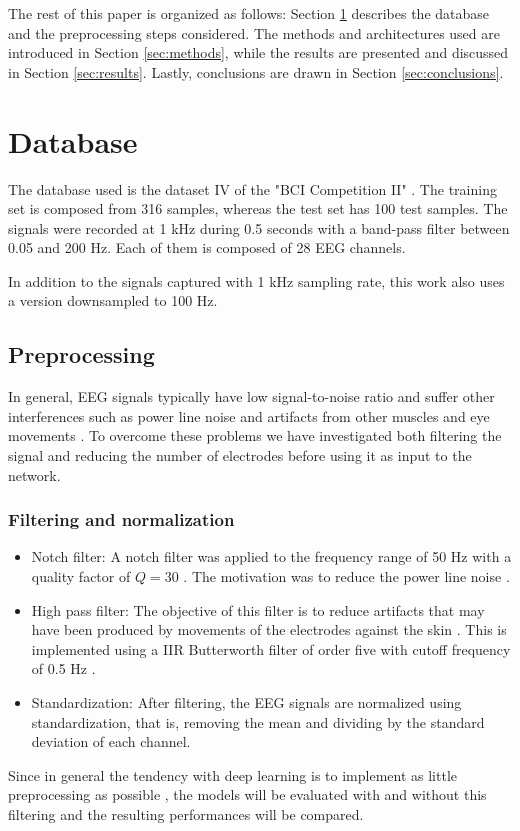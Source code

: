 \documentclass[10pt,conference,compsocconf]{IEEEtran}
\begin{document}
The rest of this paper is organized as follows: Section \ref{sec:database} describes the database and the preprocessing steps considered. The methods and architectures used are introduced in Section \ref{sec:methods}, while the results are presented and discussed in Section \ref{sec:results}. Lastly, conclusions are drawn in Section \ref{sec:conclusions}.

\section{Database}
\label{sec:database}
The database used is the dataset IV of the "BCI Competition II" \cite{data}. The training set is composed from 316 samples, whereas the test set has 100 test samples. The signals were recorded at 1 kHz during 0.5 seconds with a band-pass filter between 0.05 and 200 Hz. Each of them is composed of 28 EEG channels. 

In addition to the signals captured with 1 kHz sampling rate, this work also uses a version downsampled to 100 Hz.


\subsection{Preprocessing}
\label{ssec:preprocessing}

In general, EEG signals typically have low signal-to-noise ratio and suffer other interferences such as power line noise and artifacts from other muscles and eye movements \cite{SchirrmeisterSF17, LSTM, BashivanRYC15}. To overcome these problems we have investigated both filtering the signal and reducing the number of electrodes before using it as input to the network.

    \subsubsection{Filtering and normalization}
        \begin{itemize}
        
            \item Notch filter: A notch filter was applied to the frequency range of 50 Hz with a quality factor of $Q=30$  \cite{LSTM}. The  motivation was to reduce the power line noise  \cite{LSTM}. 
            \item High pass filter: The objective of this filter is to reduce artifacts that may have been produced by movements of the electrodes against the skin  \cite{LSTM}. This is implemented using a IIR Butterworth filter of order five with cutoff frequency of 0.5 Hz \cite{LSTM}.
            \item Standardization: After filtering, the EEG signals are normalized using standardization, that is, removing the mean and dividing by the standard deviation of each channel. 
        \end{itemize}
        Since in general the tendency with deep learning is to implement as little preprocessing as possible \cite{SchirrmeisterSF17}, the models will be evaluated with and without this filtering and  the resulting performances will be compared.
\end{document}
